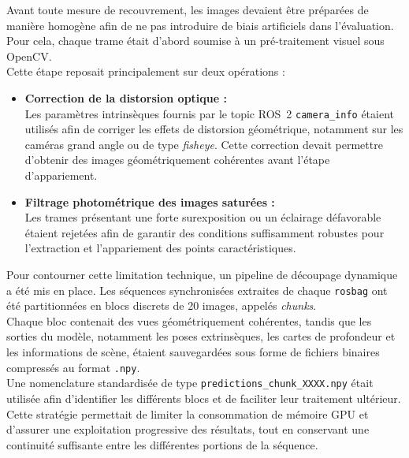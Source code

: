 \documentclass[12pt,a4paper,oneside]{report}
\begin{document}
\hspace*{.3cm}Avant toute mesure de recouvrement, les images devaient être préparées de manière homogène afin de ne pas introduire de biais artificiels dans l'évaluation. Pour cela, chaque trame était d'abord soumise à un pré-traitement visuel sous OpenCV.\\
Cette étape reposait principalement sur deux opérations :
\begin{itemize}[itemsep=0.5em]

    \item \textbf{Correction de la distorsion optique :}\\
    Les paramètres intrinsèques fournis par le topic ROS~2 \texttt{camera\_info} étaient utilisés afin de corriger les effets de distorsion géométrique, notamment sur les caméras grand angle ou de type \textit{fisheye}. Cette correction devait permettre d'obtenir des images géométriquement cohérentes avant l'étape d'appariement.

    \item \textbf{Filtrage photométrique des images saturées :}\\
    Les trames présentant une forte surexposition ou un éclairage défavorable étaient rejetées afin de garantir des conditions suffisamment robustes pour l'extraction et l'appariement des points caractéristiques.

\end{itemize}
\hspace*{.3cm}Pour contourner cette limitation technique, un pipeline de découpage dynamique a été mis en place. Les séquences synchronisées extraites de chaque \texttt{rosbag} ont été partitionnées en blocs discrets de 20 images, appelés \textit{chunks}.\\
\hspace*{.3cm}Chaque bloc contenait des vues géométriquement cohérentes, tandis que les sorties du modèle, notamment les poses extrinsèques, les cartes de profondeur et les informations de scène, étaient sauvegardées sous forme de fichiers binaires compressés au format \texttt{.npy}.\\

\hspace*{.3cm}Une nomenclature standardisée de type \texttt{predictions\_chunk\_XXXX.npy} était utilisée afin d'identifier les différents blocs et de faciliter leur traitement ultérieur.\\
Cette stratégie permettait de limiter la consommation de mémoire GPU et d'assurer une exploitation progressive des résultats, tout en conservant une continuité suffisante entre les différentes portions de la séquence.
\end{document}
